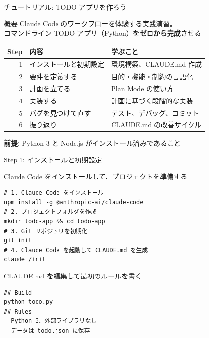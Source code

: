 \documentclass[aspectratio=169, 14pt]{beamer}
\begin{document}
\begin{frame}{チュートリアル: TODO アプリを作ろう}
  \begin{block}{概要}
    {\small Claude Code のワークフローを体験する実践演習。\\
    コマンドライン TODO アプリ（Python）を\textbf{ゼロから完成}させる}
  \end{block}

  \vspace{0.3em}

  \begin{table}
    \centering\footnotesize
    \begin{tabular}{rlp{60mm}}
      \hline
      \textbf{Step} & \textbf{内容} & \textbf{学ぶこと} \\
      \hline
      1 & インストールと初期設定 & 環境構築、CLAUDE.md 作成 \\
      2 & 要件を定義する & 目的・機能・制約の言語化 \\
      3 & 計画を立てる & Plan Mode の使い方 \\
      4 & 実装する & 計画に基づく段階的な実装 \\
      5 & バグを見つけて直す & テスト、デバッグ、コミット \\
      6 & 振り返り & CLAUDE.md の改善サイクル \\
      \hline
    \end{tabular}
  \end{table}

  {\scriptsize \textbf{前提:} Python 3 と Node.js がインストール済みであること}
\end{frame}

\begin{frame}[fragile]{Step 1: インストールと初期設定}
  \begin{block}{Claude Code をインストールして、プロジェクトを準備する}
    \begin{lstlisting}[language={}, numbers=none]
# 1. Claude Code をインストール
npm install -g @anthropic-ai/claude-code
# 2. プロジェクトフォルダを作成
mkdir todo-app && cd todo-app
# 3. Git リポジトリを初期化
git init
# 4. Claude Code を起動して CLAUDE.md を生成
claude /init
    \end{lstlisting}
  \end{block}

  \begin{exampleblock}{CLAUDE.md を編集して最初のルールを書く}
    \begin{lstlisting}[language={}, numbers=none]
## Build
python todo.py
## Rules
- Python 3、外部ライブラリなし
- データは todo.json に保存
    \end{lstlisting}
  \end{exampleblock}
\end{frame}
\end{document}
